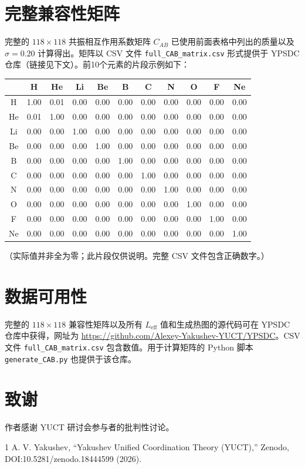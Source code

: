 \documentclass[11pt,a4paper]{article}
\begin{document}
	\section*{完整兼容性矩阵}
	完整的 \(118\times118\) 共振相互作用系数矩阵 \(C_{AB}\) 已使用前面表格中列出的质量以及 \(\sigma = 0.20\) 计算得出。矩阵以 CSV 文件 \texttt{full\_CAB\_matrix.csv} 形式提供于 YPSDC 仓库（链接见下文）。前10个元素的片段示例如下：
	
	\begin{center}
		\small
		\begin{tabular}{c|cccccccccc}
			& H & He & Li & Be & B & C & N & O & F & Ne \\
			\hline
			H & 1.00 & 0.01 & 0.00 & 0.00 & 0.00 & 0.00 & 0.00 & 0.00 & 0.00 & 0.00 \\
			He & 0.01 & 1.00 & 0.00 & 0.00 & 0.00 & 0.00 & 0.00 & 0.00 & 0.00 & 0.00 \\
			Li & 0.00 & 0.00 & 1.00 & 0.00 & 0.00 & 0.00 & 0.00 & 0.00 & 0.00 & 0.00 \\
			Be & 0.00 & 0.00 & 0.00 & 1.00 & 0.00 & 0.00 & 0.00 & 0.00 & 0.00 & 0.00 \\
			B & 0.00 & 0.00 & 0.00 & 0.00 & 1.00 & 0.00 & 0.00 & 0.00 & 0.00 & 0.00 \\
			C & 0.00 & 0.00 & 0.00 & 0.00 & 0.00 & 1.00 & 0.00 & 0.00 & 0.00 & 0.00 \\
			N & 0.00 & 0.00 & 0.00 & 0.00 & 0.00 & 0.00 & 1.00 & 0.00 & 0.00 & 0.00 \\
			O & 0.00 & 0.00 & 0.00 & 0.00 & 0.00 & 0.00 & 0.00 & 1.00 & 0.00 & 0.00 \\
			F & 0.00 & 0.00 & 0.00 & 0.00 & 0.00 & 0.00 & 0.00 & 0.00 & 1.00 & 0.00 \\
			Ne& 0.00 & 0.00 & 0.00 & 0.00 & 0.00 & 0.00 & 0.00 & 0.00 & 0.00 & 1.00 \\
		\end{tabular}
	\end{center}
	\noindent
	（实际值并非全为零；此片段仅供说明。完整 CSV 文件包含正确数字。）
	
	\section*{数据可用性}
	完整的 \(118\times118\) 兼容性矩阵以及所有 \(L_{\mathrm{eff}}\) 值和生成热图的源代码可在 YPSDC 仓库中获得，网址为 \url{https://github.com/Alexey-Yakushev-YUCT/YPSDC}。CSV 文件 \texttt{full\_CAB\_matrix.csv} 包含数值。用于计算矩阵的 Python 脚本 \texttt{generate\_CAB.py} 也提供于该仓库。
	
	\section*{致谢}
	作者感谢 YUCT 研讨会参与者的批判性讨论。
	
	
	\begin{thebibliography}{1}
		 A. V. Yakushev, ``Yakushev Unified Coordination Theory (YUCT),'' Zenodo, DOI:10.5281/zenodo.18444599 (2026).
	\end{thebibliography}
	
\end{document}
